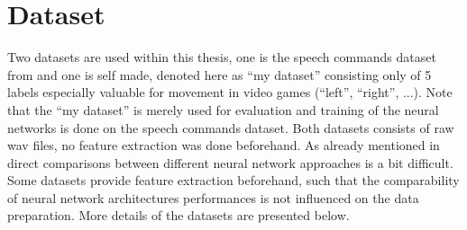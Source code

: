 
\section{Dataset}\label{sec:exp_dataset}
Two datasets are used within this thesis, one is the speech commands dataset from \cite{Warden2018} and one is self made, denoted here as \enquote{my dataset} consisting only of 5 labels especially valuable for movement in video games (\enquote{left}, \enquote{right}, ...).
Note that the \enquote{my dataset} is merely used for evaluation and training of the neural networks is done on the speech commands dataset.
Both datasets consists of raw wav files, no feature extraction was done beforehand.
As already mentioned in  direct comparisons between different neural network approaches is a bit difficult.
Some datasets provide feature extraction beforehand, such that the comparability of neural network architectures performances is not influenced on the data preparation.
More details of the datasets are presented below.






% 
